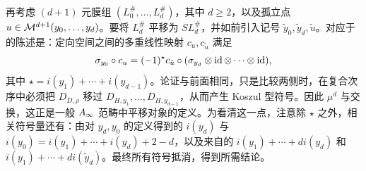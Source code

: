 再考虑 $(d+1)$ 元膜组 $(L_0^\#,\allowbreak \ldots,\allowbreak L_d^\#)$，其中 $d\geq2$，以及孤立点 $u\in\mathcal M^{d+1}(y_0,\allowbreak \ldots,\allowbreak y_d)$。要将 $L_d^\#$ 平移为 $SL_d^\#$，并如前引入记号 $\tilde y_0,\allowbreak \tilde y_d,\allowbreak \tilde u$。对应于的陈述是：定向空间之间的多重线性映射 $c_u,\allowbreak c_{\tilde u}$ 满足
\[
\sigma_{y_0}\circ c_u=(-1)^\star c_{\tilde u}\circ(\sigma_{y_d}\otimes\operatorname{id}\otimes\cdots\otimes\operatorname{id}),
\]
其中 $\star=i(y_1)+\cdots+i(y_{d-1})$。论证与前面相同，只是比较两侧时，在复合次序中必须把 $D_{D,\allowbreak \rho}$ 移过 $D_{H,\allowbreak y_1},\allowbreak \ldots,\allowbreak D_{H,\allowbreak y_{d-1}}$，从而产生 Koszul 型符号。因此 $\mu^d$ 与交换，这正是一般 $A_\infty$ 范畴中平移对象的定义。为看清这一点，注意除 $\star$ 之外，相关符号量还有：由对 $y_d,\allowbreak y_0$ 的定义得到的 $i(y_d)$ 与 $i(y_0)=i(y_1)+\cdots+i(y_d)+2-d$，以及来自的 $i(y_1)+\cdots+di(y_d)$ 和 $i(y_1)+\cdots+di(\tilde y_d)$。最终所有符号抵消，得到所需结论。
